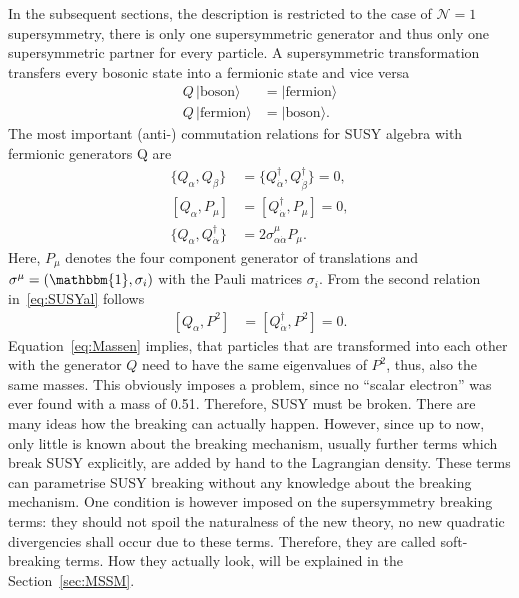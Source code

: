 In the subsequent sections, the description is restricted to the case of $\mathcal{N}=1$ supersymmetry, \ie there is only one supersymmetric generator and thus only one supersymmetric partner for every particle.
A supersymmetric transformation transfers every bosonic state into a fermionic state and vice versa  
\begin{equation}
\begin{split}
 Q\, |\text{boson}\rangle  &= |\text{fermion}\rangle\\ 
 Q\, |\text{fermion}\rangle  &= |\text{boson}\rangle.
\end{split}
\end{equation}
The most important (anti-) commutation relations for SUSY algebra with fermionic generators Q are
\begin{align}
\label{eq:SUSYal}
 \{Q_{\alpha},Q_{\beta} \} &=  \{Q^{\dagger}_{\dot{\alpha}},Q^{\dagger}_{\dot{\beta}} \} = 0,\nonumber \\
   [Q_{\alpha} , P_{\mu}] &=  [Q^{\dagger}_{\dot{\alpha}}, P_{\mu}] = 0 ,\\
\{Q_{\alpha},  Q^{\dagger}_{\dot{\alpha}}\} &= 2 \sigma_{\alpha\dot{\alpha}}^{\mu} P_{\mu} \nonumber.
\end{align}
Here, $P_{\mu}$ denotes the four component generator of translations and $\sigma^{\mu} = \left( \mathbbm{1}, \sigma_i  \right)$ with the Pauli matrices $\sigma_i$.
From the second relation in~\eqref{eq:SUSYal} follows
\begin{align}
\label{eq:Massen}
 [Q_{\alpha} , P^2] &=  [Q^{\dagger}_{\dot{\alpha}}, P^2] = 0.
\end{align}
Equation~\ref{eq:Massen} implies, that particles that are transformed into each other with the generator $Q$ need to have the same eigenvalues of $P^2$, thus, also the same masses.
This obviously imposes a problem, since no ``scalar electron'' was ever found with a mass of 0.51\mev.
Therefore, SUSY must be broken.
There are many ideas how the breaking can actually happen.
However, since up to now, only little is known about the breaking mechanism, usually further terms which break SUSY explicitly, are added by hand to the Lagrangian density.
These terms can parametrise SUSY breaking without any knowledge about the breaking mechanism.
One condition is however imposed on the supersymmetry breaking terms: they should not spoil the naturalness of the new theory, \ie no new quadratic divergencies shall occur due to these terms.
Therefore, they are called soft-breaking terms.
How they actually look, will be explained in the Section~\ref{sec:MSSM}.\\

